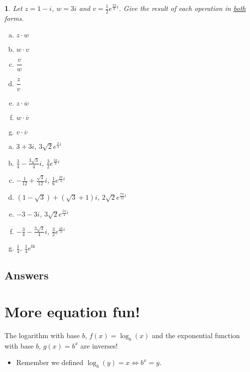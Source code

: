 \documentclass{amsbook}
\newcommand{\ssp}{\begin{enumerate}[(a), leftmargin=*]}
\newcommand{\esp}{\end{enumerate}}
\newtheorem{exc}{}
\newenvironment{ex}{\begin{exc}\normalfont}{\end{exc}}
\numberwithin{section}{chapter}
\numberwithin{equation}{chapter}
\newcommand{\qi}[1]{\begin{itemize}\item #1 \end{itemize}}
\begin{document}
\begin{ex}
	Let $z=1-i$, $w=3i$ and $v=\frac{1}{2}e^{\frac{7\pi}{6}i}$. Give the result of each operation in \underline{both} forms.
\begin{multicols}{2}
	\ssp
	\item $z\cdot w$
	\item $w\cdot v$
	\item $\dfrac{v}{w}$
	\item $\dfrac{z}{v}$
	\item $z \cdot \overline w$
	\item $w \cdot \overline v$
	\item $v \cdot \overline v$
	\esp
\end{multicols}
\begin{sol}
	\begin{multicols}{2}
		\ssp
		\item $3+3i$, $3\sqrt{2}e^{\frac{\pi}{4}i}$
		\item $\frac{3}{4}-\frac{3\sqrt{3}}{4}i$, $\frac{3}{2}e^{\frac{5\pi}{3}i}$
		\item $-\frac{1}{12}+\frac{\sqrt{3}}{12}i$, $\frac{1}{6}e^{\frac{2\pi}{3}i}$	
		\item $(1-\sqrt{3})+(\sqrt{3}+1)i$, $2\sqrt{2}e^{\frac{7\pi}{12}i}$
		\item $-3-3i$, $3\sqrt{2}e^{\frac{5\pi}{4}i}$
		\item $-\frac{3}{4}-\frac{3\sqrt{3}}{4}i$, $\frac{3}{2}e^{\frac{4\pi}{3}i}$
		\item $\frac{1}{4}$, $\frac{1}{4}e^{0i}$
		\esp
	\end{multicols}
	\end{sol}

\end{ex}


\subsection*{Answers \nopunct} \hfill
	


\newpage
\section{More equation fun!}

The logarithm with base $b$, $f(x) = \log_b(x)$ and the exponential function with base $b$, $g(x) = b^x$ are inverses!
\qi{Remember we defined $\log_b(y)=x \iff b^x=y$.}
\end{document}
